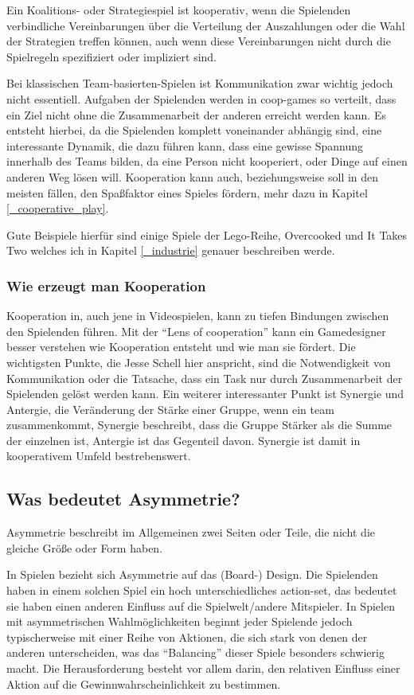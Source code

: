 Ein Koalitions- oder Strategiespiel ist kooperativ, wenn die Spielenden verbindliche Vereinbarungen über die Verteilung der Auszahlungen oder die Wahl der Strategien treffen können, auch wenn diese Vereinbarungen nicht durch die Spielregeln spezifiziert oder impliziert sind\cite{_introduction_to_the_theory_of_cooperative_games}.

Bei klassischen Team-basierten-Spielen ist Kommunikation zwar wichtig jedoch nicht essentiell. Aufgaben der Spielenden werden in coop-games so verteilt, dass ein Ziel nicht ohne die Zusammenarbeit der anderen erreicht werden kann. Es entsteht hierbei, da die Spielenden komplett voneinander abhängig sind, eine interessante Dynamik, die dazu führen kann, dass eine gewisse Spannung innerhalb des Teams bilden, da eine Person nicht kooperiert, oder Dinge auf einen anderen Weg lösen will. Kooperation kann auch, beziehungsweise soll in den meisten fällen, den Spaßfaktor eines Spieles fördern, mehr dazu in Kapitel \ref{_cooperative_play}.

Gute Beispiele hierfür sind einige Spiele der Lego-Reihe, Overcooked und It Takes Two welches ich in Kapitel \ref{_industrie} genauer beschreiben werde.

\subsubsection{Wie erzeugt man Kooperation}
Kooperation in, auch jene in Videospielen, kann zu tiefen Bindungen zwischen den Spielenden führen.
Mit der "`Lens of cooperation"'\cite[S. 311]{_gamemechanics_for_cooperative_games} kann ein Gamedesigner besser verstehen wie Kooperation entsteht und wie man sie fördert. Die wichtigsten Punkte, die Jesse Schell hier anspricht, sind die Notwendigkeit von Kommunikation oder die Tatsache, dass ein Task nur durch Zusammenarbeit der Spielenden gelöst werden kann. Ein weiterer interessanter Punkt ist Synergie und Antergie, die Veränderung der Stärke einer Gruppe, wenn ein team zusammenkommt, Synergie beschreibt, dass die Gruppe Stärker als die Summe der einzelnen ist, Antergie ist das Gegenteil davon. Synergie ist damit in kooperativem Umfeld bestrebenswert.

\subsection{Was bedeutet Asymmetrie?}

Asymmetrie beschreibt im Allgemeinen zwei Seiten oder Teile, die nicht die gleiche Größe oder Form haben\cite{_oxford_dict}.

In Spielen bezieht sich Asymmetrie auf das (Board-) Design. Die Spielenden haben in einem solchen Spiel ein hoch unterschiedliches action-set, das bedeutet sie haben einen anderen Einfluss auf die Spielwelt/andere Mitspieler. In Spielen mit asymmetrischen Wahlmöglichkeiten beginnt jeder Spielende jedoch typischerweise mit einer Reihe von Aktionen, die sich stark von denen der anderen unterscheiden, was das "`Balancing"' dieser Spiele besonders schwierig macht. Die Herausforderung besteht vor allem darin, den relativen Einfluss einer Aktion auf die Gewinnwahrscheinlichkeit zu bestimmen\cite[S. 18]{_balancing_asymmetric_video_games}.
